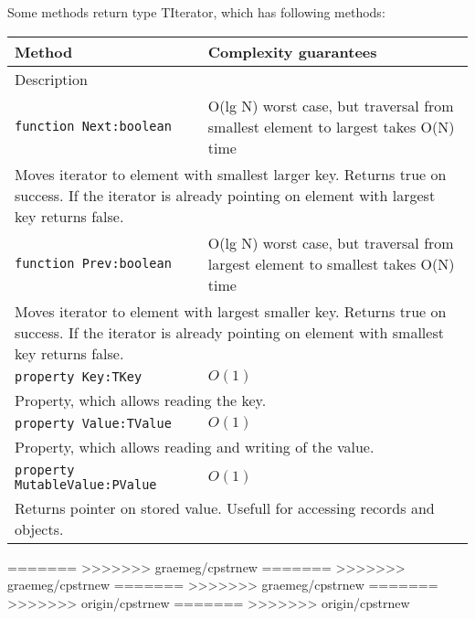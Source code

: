 Some methods return type TIterator, which has following methods:
\begin{longtable}{|m{10cm}|m{5cm}|}                                                             
\hline
Method & Complexity guarantees \\ \hline                                                  
\multicolumn{2}{|m{15cm}|}{Description} \\ \hline\hline                                               
\verb!function Next:boolean! & O(lg N) worst case, but traversal from smallest element to
largest takes O(N) time \\\hline
\multicolumn{2}{|m{15cm}|}{Moves iterator to element with smallest larger key. Returns true on
success. If the iterator is already pointing on element with largest key returns false.} \\\hline\hline

\verb!function Prev:boolean! & O(lg N) worst case, but traversal from largest element to
smallest takes O(N) time \\\hline
\multicolumn{2}{|m{15cm}|}{Moves iterator to element with largest smaller key. Returns true on
success. If the iterator is already pointing on element with smallest key returns false.} \\\hline\hline

\verb!property Key:TKey! & $O(1)$ \\\hline
\multicolumn{2}{|m{15cm}|}{Property, which allows reading the key.} \\\hline

\verb!property Value:TValue! & $O(1)$ \\\hline
\multicolumn{2}{|m{15cm}|}{Property, which allows reading and writing of the value.} \\\hline
\verb!property MutableValue:PValue! & $O(1)$ \\\hline
\multicolumn{2}{|m{15cm}|}{Returns pointer on stored value. Usefull for accessing records and
objects.} \\\hline


\end{longtable}
=======
>>>>>>> graemeg/cpstrnew
=======
>>>>>>> graemeg/cpstrnew
=======
>>>>>>> graemeg/cpstrnew
=======
>>>>>>> origin/cpstrnew
=======
>>>>>>> origin/cpstrnew
